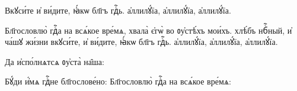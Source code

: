 \hKv Вкꙋси́те и҆ ви́дите, ꙗ҆́кѡ бл҃гъ гдⷭ҇ь. а҆ллилꙋ́їа,  а҆ллилꙋ́їа, а҆ллилꙋ́їа. 


\hKv Бл҃гословлю̀ гдⷭ҇а на всѧ́кое вре́мѧ, хвала̀ є҆гѡ̀ во  ᲂу҆стѣ́хъ мои́хъ. хлѣ́бъ нбⷭ҇ный, и҆ ча́шꙋ жи́зни  вкꙋси́те, и҆ ви́дите, ꙗ҆́кѡ бл҃гъ гдⷭ҇ь. а҆ллилꙋ́їа,  а҆ллилꙋ́їа, а҆ллилꙋ́їа. 


\hKv Да и҆спо́лнѧтсѧ ᲂу҆ста̀ на̑ша: 
%

 Бꙋ́ди и҆́мѧ гдⷭ҇не бл҃гослове́но:   Бл҃гословлю̀ гдⷭ҇а на всѧ́кое вре́мѧ:  
